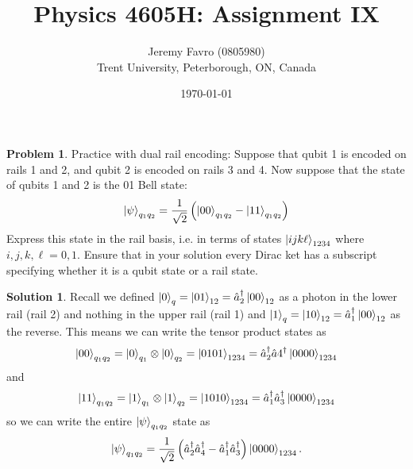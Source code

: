 \documentclass[10pt]{article}
\title{Physics 4605H: Assignment IX}
\author{Jeremy Favro (0805980) \\ Trent University, Peterborough, ON, Canada}
\date{\today}
\theoremstyle{definition}
\newtheorem{problem}{Problem}
\newtheorem{soln}{Solution}
\begin{document}
\maketitle

\begin{problem}
Practice with dual rail encoding:
Suppose that qubit 1 is encoded on rails 1 and 2, and qubit 2 is encoded on rails 3 and 4.
Now suppose that the state of qubits 1 and 2 is the 01 Bell state:
$$
  \ket{\psi}_{q_1q_2}=\frac{1}{\sqrt{2}}\left(\ket{00}_{q_1q_2}-\ket{11}_{q_1q_2}\right)
$$
Express this state in the rail basis, i.e. in terms of states $\ket{ijk\ell}_{1234}$ where $i, j, k, \ell = 0, 1$.
Ensure that in your solution every Dirac ket has a subscript specifying whether it is a qubit
state or a rail state.
\end{problem}
\begin{soln}
  Recall we defined $\ket{0}_q=\ket{01}_{12}=\hat{a}_2^\dagger\ket{00}_{12}$ as a photon in the lower rail (rail 2) and nothing in the upper rail (rail 1)
  and $\ket{1}_q=\ket{10}_{12}=\hat{a}_1^\dagger\ket{00}_{12}$ as the reverse. This means we can write the tensor product states as
  $$\ket{00}_{q_1q_2}=\ket{0}_{q_1}\otimes\ket{0}_{q_2}=\ket{0101}_{1234}=\hat{a}_2^\dagger\hat{a}4^\dagger\ket{0000}_{1234}$$
  and
  $$\ket{11}_{q_1q_2}=\ket{1}_{q_1}\otimes\ket{1}_{q_2}=\ket{1010}_{1234}=\hat{a}_1^\dagger\hat{a}_3^\dagger\ket{0000}_{1234}$$ so
  we can write the entire $\ket{\psi}_{q_1q_2}$ state as
  $$\ket{\psi}_{q_1q_2}=\frac{1}{\sqrt{2}}\left(\hat{a}_2^\dagger\hat{a}_4^\dagger-\hat{a}_1^\dagger\hat{a}_3^\dagger\right)\ket{0000}_{1234}.$$
\end{soln}
\newpage
\end{document}
